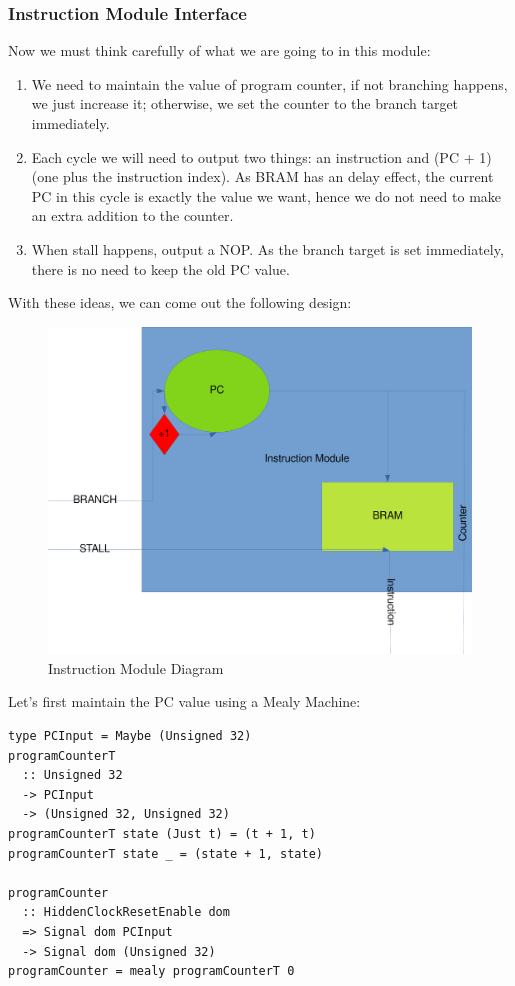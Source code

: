 \documentclass[a4paper,12pt, oneside]{book}
\begin{document}
\subsubsection{Instruction Module Interface}
Now we must think carefully of what we are going to in this module:
\begin{enumerate}
	\item We need to maintain the value of program counter, if not branching happens, we just increase it; otherwise, we set the counter to the branch target immediately.
	\item Each cycle we will need to output two things: an instruction and (PC + 1) (one plus the instruction index). As BRAM has an delay effect, the current PC in this cycle is exactly the value we want, hence we do not need to make an extra addition to the counter.
	\item When stall happens, output a NOP. As the branch target is set immediately, there is no need to keep the old PC value.
\end{enumerate}
With these ideas, we can come out the following design:
\begin{figure}[H]
	\centering
	\includegraphics[width=\linewidth]{im}
	\caption{Instruction Module Diagram}
\end{figure}
Let's first maintain the PC value using a Mealy Machine:    
\begin{verbatim}
type PCInput = Maybe (Unsigned 32)
programCounterT 
  :: Unsigned 32 
  -> PCInput
  -> (Unsigned 32, Unsigned 32)
programCounterT state (Just t) = (t + 1, t)
programCounterT state _ = (state + 1, state)

programCounter 
  :: HiddenClockResetEnable dom
  => Signal dom PCInput
  -> Signal dom (Unsigned 32)
programCounter = mealy programCounterT 0
\end{verbatim}
\end{document}
